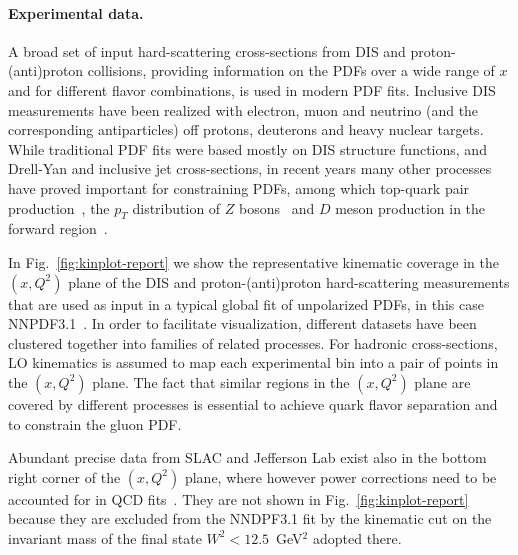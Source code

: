 \paragraph*{Experimental data.}
A broad set of input hard-scattering cross-sections from DIS and
proton-(anti)proton collisions, providing information on the PDFs over a wide 
range of $x$ and for different flavor combinations, is used in modern PDF fits.
%
Inclusive DIS measurements have been realized with electron, muon and neutrino
(and the corresponding antiparticles) off protons, deuterons and
heavy nuclear targets. 
%
While traditional PDF fits were based mostly on DIS structure functions, 
and Drell-Yan and inclusive jet cross-sections, in recent years many other 
processes have proved important for constraining PDFs, among which
top-quark pair production~\cite{Czakon:2016olj}, the $p_T$ distribution of $Z$ 
bosons~\cite{Boughezal:2017nla} and $D$ meson production in 
the forward region~\cite{Gauld:2016kpd}.

In Fig.~\ref{fig:kinplot-report} we show the representative kinematic coverage 
in the $(x,Q^2)$ plane of the DIS and proton-(anti)proton hard-scattering 
measurements that are used as input in a typical global fit of unpolarized 
PDFs, in this case NNPDF3.1~\cite{Ball:2017nwa}.
%
In order to facilitate visualization, different datasets have been clustered 
together into families of related processes.
%
For hadronic cross-sections, LO kinematics is assumed to map
each experimental bin into a pair of points in the $(x,Q^2)$ plane.
%
The fact that similar regions in the $(x,Q^2)$ plane are covered by
different processes is essential to achieve quark
flavor separation and to constrain the gluon PDF.

Abundant precise data from SLAC and Jefferson Lab exist also in the 
bottom right corner of the $(x,Q^2)$ plane, where however power corrections 
need to be accounted for 
in QCD fits~\cite{Alekhin:2017kpj,Owens:2012bv,Accardi:2016qay}.
%
They are not shown in Fig.~\ref{fig:kinplot-report} because they are excluded 
from the NNDPF3.1 fit by the kinematic cut on the invariant mass of the final
state $W^2<12.5$~GeV$^2$ adopted there.

